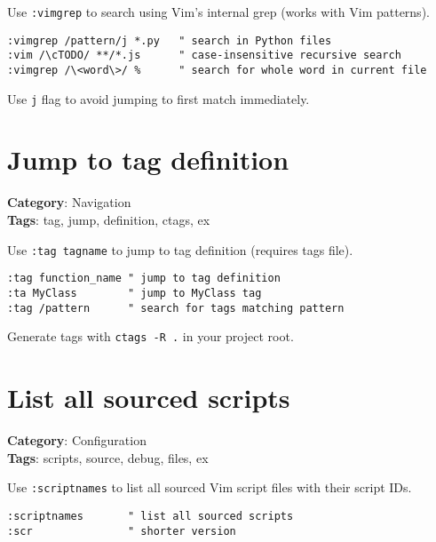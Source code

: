 {{{{{Use {\footnotesize \Verb§:vimgrep§} to search using Vim's internal grep (works with Vim patterns).

\begin{Exa*}{}
\begin{Verbatim}[fontsize=\footnotesize, breaklines, breakanywhere]
:vimgrep /pattern/j *.py   " search in Python files
:vim /\cTODO/ **/*.js      " case-insensitive recursive search
:vimgrep /\<word\>/ %      " search for whole word in current file
\end{Verbatim}
\end{Exa*}

Use {\footnotesize \Verb§j§} flag to avoid jumping to first match immediately.

\section{Jump to tag definition}

\textbf{Category}: Navigation\\ \textbf{Tags}: tag, jump, definition, ctags, ex
\vspace{0.5cm}

Use {\footnotesize \Verb§:tag tagname§} to jump to tag definition (requires tags file).

\begin{Exa*}{}
\begin{Verbatim}[fontsize=\footnotesize, breaklines, breakanywhere]
:tag function_name " jump to tag definition
:ta MyClass        " jump to MyClass tag
:tag /pattern      " search for tags matching pattern
\end{Verbatim}
\end{Exa*}

Generate tags with {\footnotesize \Verb§ctags -R .§} in your project root.

\section{List all sourced scripts}

\textbf{Category}: Configuration\\ \textbf{Tags}: scripts, source, debug, files, ex
\vspace{0.5cm}

Use {\footnotesize \Verb§:scriptnames§} to list all sourced Vim script files with their script IDs.

\begin{Exa*}{}
\begin{Verbatim}[fontsize=\footnotesize, breaklines, breakanywhere]
:scriptnames       " list all sourced scripts
:scr               " shorter version
\end{Verbatim}
\end{Exa*}

}}}}}
